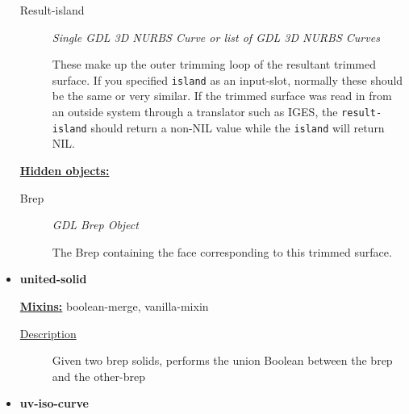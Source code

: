 \documentclass [11pt]{book}
\begin{document}
\begin{itemize}
\begin{description}
\item [Result-island]
\emph{Single GDL 3D NURBS Curve or list of GDL 3D NURBS Curves}

 These make up the outer trimming loop of the resultant
trimmed surface. If you specified \texttt{island} as an input-slot, normally these should be the same
or very similar. If the trimmed surface was read in from an outside system through a translator such as IGES,
the \texttt{result-island} should return a non-NIL value while the \texttt{island} will return NIL.




\end{description}






\textbf{
\underline{Hidden objects:}}

\begin{description}

\item [Brep]
\emph{GDL Brep Object}

 The Brep containing the face corresponding to this trimmed surface.




\end{description}







\item {}
\label{prim:united-solid}
\textbf{united-solid}


\textbf{
\underline{Mixins:}} boolean-merge, vanilla-mixin





\begin{description}

\item [
\underline{Description}]


Given two brep solids, performs the union Boolean between the brep and the other-brep



\end{description}









\item {}
\label{prim:uv-iso-curve}
\textbf{uv-iso-curve}



\end{itemize}
\end{document}
